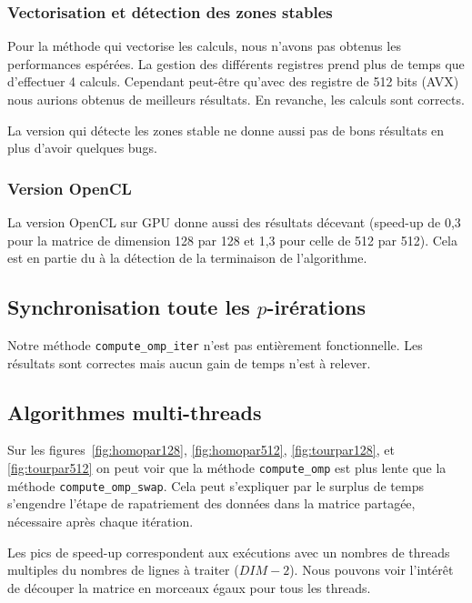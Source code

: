 \subsubsection{Vectorisation et détection des zones stables}

Pour la méthode qui vectorise les calculs, nous n'avons pas obtenus
les performances espérées. La gestion des différents registres prend
plus de temps que d'effectuer 4 calculs. Cependant peut-être qu'avec
des registre de 512 bits (AVX) nous aurions obtenus de meilleurs
résultats. En revanche, les calculs sont corrects.

La version qui détecte les zones stable ne donne aussi pas de bons
résultats en plus d'avoir quelques bugs.

\subsubsection{Version OpenCL}
\label{sec:res-opencl}

La version OpenCL sur GPU donne aussi des résultats décevant (speed-up
de 0,3 pour la matrice de dimension 128 par 128 et 1,3 pour celle de
512 par 512). Cela est en partie du à la détection de la terminaison
de l'algorithme.

\subsection{Synchronisation toute les $p$-irérations}

Notre méthode \texttt{compute\_omp\_iter} n'est pas entièrement
fonctionnelle. Les résultats sont correctes mais aucun gain de temps
n'est à relever.

\subsection{Algorithmes multi-threads}

Sur les figures~\ref{fig:homopar128}, \ref{fig:homopar512},
\ref{fig:tourpar128}, et \ref{fig:tourpar512} on peut voir que la
méthode \texttt{compute\_omp} est plus lente que la méthode
\texttt{compute\_omp\_swap}. Cela peut s'expliquer par le surplus de
temps s'engendre l'étape de rapatriement des données dans la matrice
partagée, nécessaire après chaque itération.
\medskip

Les pics de speed-up correspondent aux exécutions avec un nombres de
threads multiples du nombres de lignes à traiter ($DIM-2$). Nous
pouvons voir l'intérêt de découper la matrice en morceaux égaux pour
tous les threads.
\medskip


